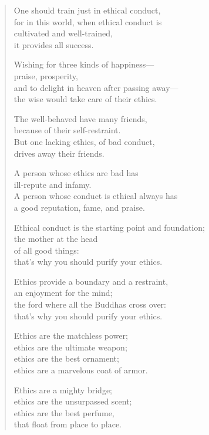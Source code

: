 \documentclass[12pt,openany]{book}%
\begin{document}
\begin{verse}%
One should train just in ethical conduct, \\
for in this world, when ethical conduct is \\
cultivated and well-trained, \\
it provides all success. 

Wishing for three kinds of happiness—\\
praise, prosperity, \\
and to delight in heaven after passing away—\\
the wise would take care of their ethics. 

The well-behaved have many friends, \\
because of their self-restraint. \\
But one lacking ethics, of bad conduct, \\
drives away their friends. 

A person whose ethics are bad has \\
ill-repute and infamy. \\
A person whose conduct is ethical always has \\
a good reputation, fame, and praise. 

Ethical conduct is the starting point and foundation; \\
the mother at the head \\
of all good things: \\
that’s why you should purify your ethics. 

Ethics provide a boundary and a restraint, \\
an enjoyment for the mind; \\
the ford where all the Buddhas cross over: \\
that’s why you should purify your ethics. 

Ethics are the matchless power; \\
ethics are the ultimate weapon; \\
ethics are the best ornament; \\
ethics are a marvelous coat of armor. 

Ethics are a mighty bridge; \\
ethics are the unsurpassed scent; \\
ethics are the best perfume, \\
that float from place to place. 


\end{verse}
\end{document}

